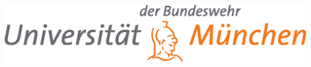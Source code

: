 \begin{titlepage}
\begin{center}

\includegraphics[width=0.8\columnwidth]{figures/unibw}

\vspace{2cm}

{\Huge \bfseries \ttitle\par}\vspace{2cm} %

{\Large \ttype\par}

\vfill


\end{center}
\end{titlepage}
